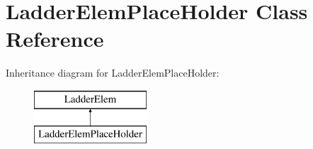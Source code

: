 \hypertarget{class_ladder_elem_place_holder}{\section{Ladder\-Elem\-Place\-Holder Class Reference}
\label{class_ladder_elem_place_holder}
}
Inheritance diagram for Ladder\-Elem\-Place\-Holder\-:\begin{figure}[H]
\begin{center}
\leavevmode
\includegraphics[height=2.000000cm]{class_ladder_elem_place_holder}
\end{center}
\end{figure}
